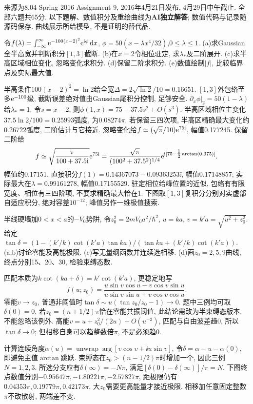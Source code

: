 来源为8.04 Spring 2016 Assignment 9, 2016年4月21日发布, 4月29日中午截止. 全部六题共65分. 以下题解、数值积分及重绘曲线为\textbf{AI独立解答}; 数值代码与记录随源码保存. 曲线展示所给模型, 不是证明的替代品.
\begin{exercise}
令$f(\lambda)=\int_{-\infty}^\infty\mathrm e^{-100(x-2)^2}\mathrm e^{\mathrm i\phi}\,\mathrm d x$, $\phi=50(x-\lambda x^4/32)$,$0\leq\lambda\leq1$. (a)求Gaussian全半高宽并判断积分$[1,3]$截断. (b)在$x=2$令相位驻定, 求$\lambda_*$及二阶展开. (c)求半高区域相位变化, 忽略变化求积分. (d)保留二阶求积分. (e)数值绘制$|f|$, 比较临界点及实际最大值.
\end{exercise}
\begin{solution}
半高条件$100(x-2)^2=\ln2$给全宽$\Delta=2\sqrt{\ln2}/10=0.16651$. $[1,3]$外包络至多$\mathrm e^{-100}$级, 截断误差绝对值由Gaussian尾积分控制, 足够安全. $\partial_x\phi|_2=50(1-\lambda)$给$\lambda_*=1$. 令$s=x-2$, 则$\phi(1,x)=75-37.5s^2+O(s^3)$. 半高区域相位主变化$37.5\ln2/100=0.25993$弧度, 为$0.08274\pi$. 若保留三四次项, 半高区精确最大变化约0.26722弧度, 二阶估计与它接近. 忽略变化给$f\simeq(\sqrt\pi/10)\mathrm e^{75\mathrm i}$, 幅值0.177245. 保留二阶给
\[
f\simeq\sqrt{\frac\pi{100+37.5\mathrm i}}\mathrm e^{75\mathrm i}
=\frac{\sqrt\pi}{(100^2+37.5^2)^{1/4}}\mathrm e^{\mathrm i[75-\tfrac12\arctan(0.375)]}.
\]
幅值约0.17151. 直接积分$f(1)=0.14367073-0.09363253\ii$, 幅值0.17148857; 实际最大在$\lambda=0.99161278$, 幅值0.17155529. 驻定相位给峰位置的近似, 包络有有限宽度、相位有三四阶项, 不要求精确最大恰在1. 下图取$[1,3]$复积分分别对实虚部自适应积分, 绝对容差$10^{-12}$; 峰值另作一维极值搜索.

\end{solution}
\begin{exercise}
半线硬墙加$0<x<a$的$-V_0$势阱, 令$z_0^2=2mV_0a^2/\hbar^2$, $u=ka$, $v=k\prime a=\sqrt{u^2+z_0^2}$. 给定$\tan\delta=(1-(k'/k)\cot(k'a)\tan ka)/(\tan ka+(k'/k)\cot(k'a))$. (a,b)讨论零能及高能极限. (c)写无量纲函数并连续选相移. (d)画$z_0=2,5,9$曲线, 终点分别15、20、30, 检验束缚态数.
\end{exercise}
\begin{solution}
匹配本质为$k\cot(ka+\delta)=k'\cot(k'a)$, 更稳定地写
\[
f(u;z_0)=\frac{u\sin v\cos u-v\cos v\sin u}{u\sin v\sin u+v\cos v\cos u}.
\]
零能$v\to z_0$, 普通非阈值时$\tan\delta\sim u(\tan z_0/z_0-1)\to0$. 题中三例均可取$\delta(0)=0$. 若$z_0=(n+1/2)\pi$恰在零能共振阈值, 此结论需改为半束缚态版本, 不能忽略该例外. 高能$v=u+z_0^2/(2u)+O(u^{-3})$, 匹配与自由波差趋0, 所以$\tan\delta\to0$; 但相移自身可以趋整数倍$\pi$, 不是必须趋0.

计算连续角度$\alpha(u)=\operatorname{unwrap}\arg[v\cos v+\ii u\sin v]$, 令$\delta=\alpha-u-\alpha(0)$, 即避免主值$\arctan$跳跃. 束缚态在$z_0>(n-1/2)\pi$时增加一个, 因此三例$N=1,2,3$. 所选分支应有$\delta(\infty)=-N\pi$, 满足$[\delta(0)-\delta(\infty)]/\pi=N$. 下图终点数值分别$-0.95647\pi,-1.80221\pi,-2.57827\pi$, 距极限仍有$0.04353\pi,0.19779\pi,0.42173\pi$, 大$z_0$需要更高能量才接近极限. 相移加任意固定整数$\pi$不改散射, 两端差不变.

\end{solution}
